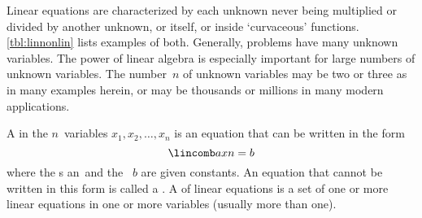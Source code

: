 Linear equations are characterized by each unknown never being multiplied or divided by another unknown, or itself, or inside `curvaceous' functions.  
\cref{tbl:linnonlin} lists examples of both.
Generally, problems have many unknown variables.
The power of linear algebra is especially important for large numbers of unknown variables.
The number~\(n\) of unknown variables may be two or three as in many examples herein, or may be thousands or millions in many modern applications.




\begin{definition} \label{def:lineqn} 
A  in the \(n\)~variables \(x_1,x_2,\ldots,x_n\) is an equation that can be written in the form
\begin{equation*}
\lincomb axn=b
\end{equation*}
where the s \hlist an\ and the ~\(b\) are given  constants.
An equation that cannot be written in this form is called a .
A  of linear equations is a set of one or more linear equations in one or more variables (usually more than one).
\end{definition}


